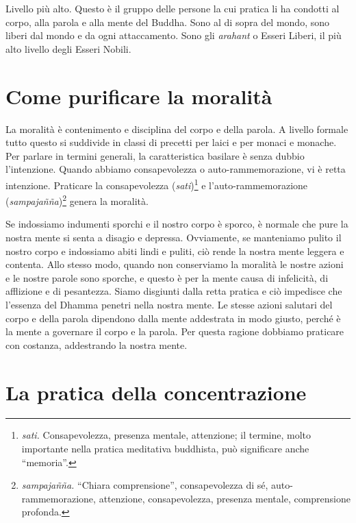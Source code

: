 Livello più alto. Questo è il gruppo delle persone la cui pratica li ha
condotti al corpo, alla parola e alla mente del Buddha. Sono al di sopra
del mondo, sono liberi dal mondo e da ogni attaccamento. Sono gli
\emph{arahant} o Esseri Liberi, il più alto livello degli Esseri Nobili.

\section{Come purificare la moralità}

La moralità è contenimento e disciplina del corpo e della parola. A
livello formale tutto questo si suddivide in classi di precetti per
laici e per monaci e monache. Per parlare in termini generali, la
caratteristica basilare è senza dubbio l'intenzione. Quando abbiamo
consapevolezza o auto-rammemorazione, vi è retta intenzione. Praticare
la consapevolezza (\emph{sati})\footnote{\emph{sati.} Consapevolezza,
  presenza mentale, attenzione; il termine, molto importante nella
  pratica meditativa buddhista, può significare anche ``memoria''.} e
l'auto-rammemorazione (\emph{sampajañña})\footnote{\emph{sampajañña.}
  ``Chiara comprensione'', consapevolezza di sé, auto-rammemorazione,
  attenzione, consapevolezza, presenza mentale, comprensione profonda.}
genera la moralità.

Se indossiamo indumenti sporchi e il nostro corpo è sporco, è normale
che pure la nostra mente si senta a disagio e depressa. Ovviamente, se
manteniamo pulito il nostro corpo e indossiamo abiti lindi e puliti, ciò
rende la nostra mente leggera e contenta. Allo stesso modo, quando non
conserviamo la moralità le nostre azioni e le nostre parole sono
sporche, e questo è per la mente causa di infelicità, di afflizione e di
pesantezza. Siamo disgiunti dalla retta pratica e ciò impedisce che
l'essenza del Dhamma penetri nella nostra mente. Le stesse azioni
salutari del corpo e della parola dipendono dalla mente addestrata in
modo giusto, perché è la mente a governare il corpo e la parola. Per
questa ragione dobbiamo praticare con costanza, addestrando la nostra
mente.

\section{La pratica della concentrazione}

